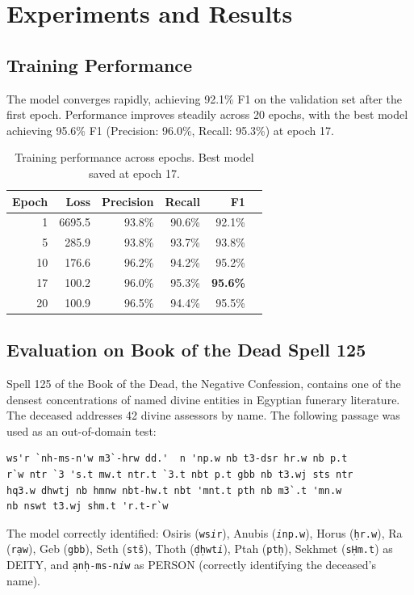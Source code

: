 \documentclass[11pt]{article}
\begin{document}
\section{Experiments and Results}

\subsection{Training Performance}

The model converges rapidly, achieving 92.1\% F1 on the validation set after the first epoch. Performance improves steadily across 20 epochs, with the best model achieving 95.6\% F1 (Precision: 96.0\%, Recall: 95.3\%) at epoch 17.

\begin{table}[h]
\centering
\begin{tabular}{@{}rrrrrr@{}}
\toprule
Epoch & Loss & Precision & Recall & F1 \\
\midrule
1  & 6695.5 & 93.8\% & 90.6\% & 92.1\% \\
5  & 285.9  & 93.8\% & 93.7\% & 93.8\% \\
10 & 176.6  & 96.2\% & 94.2\% & 95.2\% \\
17 & 100.2  & 96.0\% & 95.3\% & \textbf{95.6\%} \\
20 & 100.9  & 96.5\% & 94.4\% & 95.5\% \\
\bottomrule
\end{tabular}
\caption{Training performance across epochs. Best model saved at epoch 17.}
\label{tab:training}
\end{table}

\subsection{Evaluation on Book of the Dead Spell 125}

Spell 125 of the Book of the Dead, the Negative Confession, contains one of the densest concentrations of named divine entities in Egyptian funerary literature. The deceased addresses 42 divine assessors by name. The following passage was used as an out-of-domain test:

\begin{lstlisting}
ws'r `nh-ms-n'w m3`-hrw dd.'  n 'np.w nb t3-dsr hr.w nb p.t
r`w ntr `3 's.t mw.t ntr.t `3.t nbt p.t gbb nb t3.wj sts ntr
hq3.w dhwtj nb hmnw nbt-hw.t nbt 'mnt.t pth nb m3`.t 'mn.w
nb nswt t3.wj shm.t 'r.t-r`w
\end{lstlisting}

The model correctly identified: Osiris (\texttt{ws\textit{i}r}), Anubis (\texttt{\textit{i}np.w}), Horus (\texttt{\d{h}r.w}), Ra (\texttt{r\d{a}w}), Geb (\texttt{gbb}), Seth (\texttt{st\v{s}}), Thoth (\texttt{\d{d}\d{h}wt\textit{i}}), Ptah (\texttt{pt\d{h}}), Sekhmet (\texttt{s\d{H}m.t}) as DEITY, and \texttt{\d{a}n\d{h}-ms-n\textit{i}w} as PERSON (correctly identifying the deceased's name).
\end{document}
